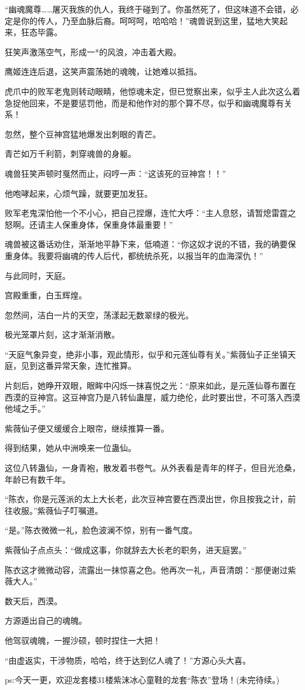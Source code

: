 \begin{this_body}
“幽魂魔尊……屠灭我族的仇人，我终于碰到了。你虽然死了，但这味道不会错，必定是你的传人，乃至血脉后裔。呵呵呵，哈哈哈！”魂兽说到这里，猛地大笑起来，狂态毕露。

狂笑声激荡空气，形成一*的风浪，冲击着大殿。

鹰姬连连后退，这笑声震荡她的魂魄，让她难以抵挡。

虎爪中的败军老鬼则转动眼睛，他惊魂未定，但已觉察出来，似乎主人此次这么着急捉他回来，不是要惩罚他，而是和他作对的那个算不尽，似乎和幽魂魔尊有关系！

忽然，整个豆神宫猛地爆发出刺眼的青芒。

青芒如万千利箭，刺穿魂兽的身躯。

魂兽狂笑声顿时戛然而止，闷哼一声：“这该死的豆神宫！！”

他咆哮起来，心烦气躁，就要更加发狂。

败军老鬼深怕他一个不小心，把自己捏爆，连忙大呼：“主人息怒，请暂熄雷霆之怒啊。还请主人保重身体，保重身体最重要！”

魂兽被这番话劝住，渐渐地平静下来，低喃道：“你这奴才说的不错，我的确要保重身体。我要将幽魂的传人后代，都统统杀死，以报当年的血海深仇！”

与此同时，天庭。

宫殿重重，白玉辉煌。

忽然间，洁白一片的天空，荡漾起无数翠绿的极光。

极光笼罩片刻，这才渐渐消散。

“天庭气象异变，绝非小事，观此情形，似乎和元莲仙尊有关。”紫薇仙子正坐镇天庭，见到这番异常天象，连忙推算。

片刻后，她睁开双眼，眼眸中闪烁一抹喜悦之光：“原来如此，是元莲仙尊布置在西漠的豆神宫。这豆神宫乃是八转仙蛊屋，威力绝伦，此时要出世，不可落入西漠他域之手。”

紫薇仙子便又缓缓合上眼帘，继续推算一番。

得到结果，她从中洲唤来一位蛊仙。

这位八转蛊仙，一身青袍，散发着书卷气。从外表看是青年的样子，但目光沧桑，年龄已有数千年。

“陈衣，你是元莲派的太上大长老，此次豆神宫要在西漠出世，你且按我之计，前往收服。”紫薇仙子叮嘱道。

“是。”陈衣微微一礼，脸色波澜不惊，别有一番气度。

紫薇仙子点点头：“做成这事，你就辞去大长老的职务，进天庭罢。”

陈衣这才微微动容，流露出一抹惊喜之色。他再次一礼，声音清朗：“那便谢过紫薇大人。”

数天后，西漠。

方源遁出自己的魂魄。

他驾驭魂魄，一握沙硕，顿时捏住一大把！

“由虚返实，干涉物质，哈哈，终于达到亿人魂了！”方源心头大喜。

ps:今天一更，欢迎龙套楼31楼紫沫冰心童鞋的龙套“陈衣”登场！(未完待续。)

\end{this_body}

